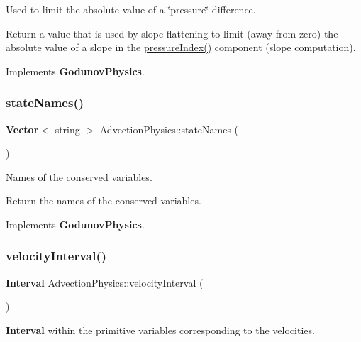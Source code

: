 Used to limit the absolute value of a \char`\"{}pressure\char`\"{} difference. 

Return a value that is used by slope flattening to limit (away from zero) the absolute value of a slope in the \hyperlink{class_advection_physics_a7b88645af918e8ae6ad2ec21eb49734f}{pressure\+Index()} component (slope computation). 

Implements \textbf{ Godunov\+Physics}.

\mbox{\label{class_advection_physics_a992f0d9ca9515de44b82981c14a2fb31}} 
\subsubsection{\texorpdfstring{state\+Names()}{stateNames()}}
{\footnotesize\ttfamily \textbf{ Vector}$<$ string $>$ Advection\+Physics\+::state\+Names (\begin{DoxyParamCaption}{ }\end{DoxyParamCaption})\hspace{0.3cm}{\ttfamily [virtual]}}



Names of the conserved variables. 

Return the names of the conserved variables. 

Implements \textbf{ Godunov\+Physics}.

\mbox{\label{class_advection_physics_a245ebc2c16520c7f50cc25efc1eb5a0d}} 
\subsubsection{\texorpdfstring{velocity\+Interval()}{velocityInterval()}}
{\footnotesize\ttfamily \textbf{ Interval} Advection\+Physics\+::velocity\+Interval (\begin{DoxyParamCaption}{ }\end{DoxyParamCaption})\hspace{0.3cm}{\ttfamily [virtual]}}



\textbf{ Interval} within the primitive variables corresponding to the velocities. 

